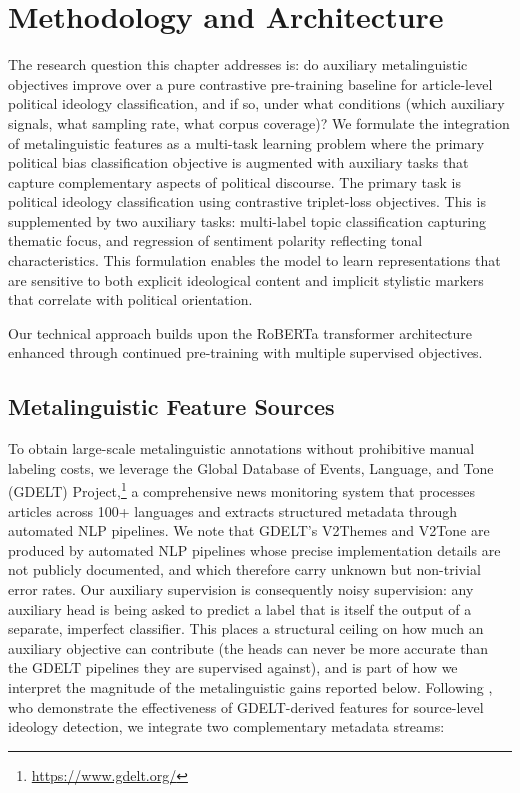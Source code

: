 \section{Methodology and Architecture}
\label{sec:methodology}

The research question this chapter addresses is: do auxiliary metalinguistic objectives improve over a pure contrastive pre-training baseline for article-level political ideology classification, and if so, under what conditions (which auxiliary signals, what sampling rate, what corpus coverage)? We formulate the integration of metalinguistic features as a multi-task learning problem where the primary political bias classification objective is augmented with auxiliary tasks that capture complementary aspects of political discourse. The primary task is political ideology classification using contrastive triplet-loss objectives. This is supplemented by two auxiliary tasks: multi-label topic classification capturing thematic focus, and regression of sentiment polarity reflecting tonal characteristics. This formulation enables the model to learn representations that are sensitive to both explicit ideological content and implicit stylistic markers that correlate with political orientation.

Our technical approach builds upon the RoBERTa transformer architecture enhanced through continued pre-training with multiple supervised objectives. 
\subsection{Metalinguistic Feature Sources}
\label{sec:feature-sources}

To obtain large-scale metalinguistic annotations without prohibitive manual labeling costs, we leverage the Global Database of Events, Language, and Tone (GDELT) Project,\footnote{\url{https://www.gdelt.org/}} a comprehensive news monitoring system that processes articles across 100+ languages and extracts structured metadata through automated NLP pipelines. We note that GDELT's V2Themes and V2Tone are produced by automated NLP pipelines whose precise implementation details are not publicly documented, and which therefore carry unknown but non-trivial error rates. Our auxiliary supervision is consequently noisy supervision: any auxiliary head is being asked to predict a label that is itself the output of a separate, imperfect classifier. This places a structural ceiling on how much an auxiliary objective can contribute (the heads can never be more accurate than the GDELT pipelines they are supervised against), and is part of how we interpret the magnitude of the metalinguistic gains reported below. Following \citet{ronnback2025biasoutlets}, who demonstrate the effectiveness of GDELT-derived features for source-level ideology detection, we integrate two complementary metadata streams:

